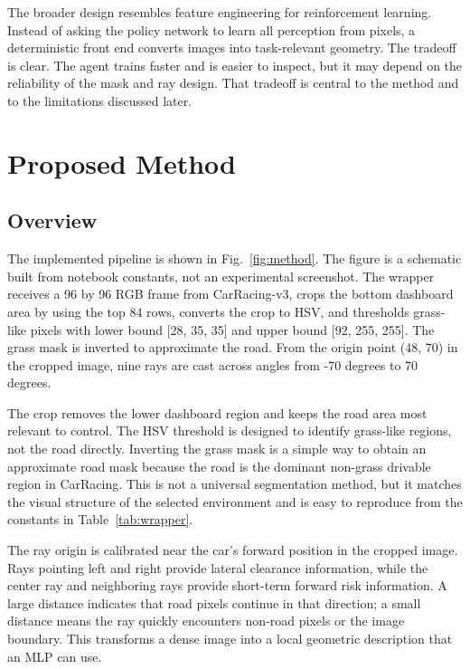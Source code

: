 \documentclass[conference]{IEEEtran}
\begin{document}
The broader design resembles feature engineering for reinforcement learning. Instead of asking the policy network to learn all perception from pixels, a deterministic front end converts images into task-relevant geometry. The tradeoff is clear. The agent trains faster and is easier to inspect, but it may depend on the reliability of the mask and ray design. That tradeoff is central to the method and to the limitations discussed later.

\section{Proposed Method}

\subsection{Overview}

The implemented pipeline is shown in Fig.~\ref{fig:method}. The figure is a schematic built from notebook constants, not an experimental screenshot. The wrapper receives a 96 by 96 RGB frame from CarRacing-v3, crops the bottom dashboard area by using the top 84 rows, converts the crop to HSV, and thresholds grass-like pixels with lower bound [28, 35, 35] and upper bound [92, 255, 255]. The grass mask is inverted to approximate the road. From the origin point (48, 70) in the cropped image, nine rays are cast across angles from -70 degrees to 70 degrees.

The crop removes the lower dashboard region and keeps the road area most relevant to control. The HSV threshold is designed to identify grass-like regions, not the road directly. Inverting the grass mask is a simple way to obtain an approximate road mask because the road is the dominant non-grass drivable region in CarRacing. This is not a universal segmentation method, but it matches the visual structure of the selected environment and is easy to reproduce from the constants in Table~\ref{tab:wrapper}.

The ray origin is calibrated near the car's forward position in the cropped image. Rays pointing left and right provide lateral clearance information, while the center ray and neighboring rays provide short-term forward risk information. A large distance indicates that road pixels continue in that direction; a small distance means the ray quickly encounters non-road pixels or the image boundary. This transforms a dense image into a local geometric description that an MLP can use.
\end{document}
